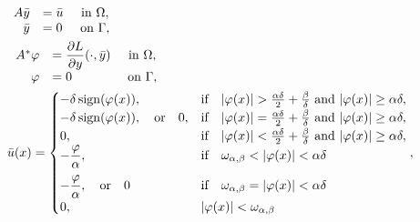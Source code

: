 \documentclass[11pt,a4paper]{amsart}
\newcommand{\om}{\Omega}
\newcommand{\ga}{\Gamma}
\newcommand{\sign}{\mathrm{sign}}
\begin{document}
\begin{subequations}\label{eq:optimal_system_P0}
	\begin{align}
&\begin{array}{rlc}
	A\bar y  & = \bar u & \text{ in } \om, \\
      \bar y &= 0 & \text{ on } \ga, 
\end{array}\\
%
&\,\begin{array}{rlc}
	A^*\varphi & = \dfrac{\partial L}{\partial y}(\cdot,\bar y)& \text{ in } \om, \\
      \varphi &= 0 & \text{ on } \ga ,
\end{array} \label{eq:optimal_system_P0_b}\\
& \bar u(x) = 
\begin{cases} 
-\delta \,\sign(\varphi(x)), &\text{if}\quad |\varphi(x)| > \frac{\alpha \delta}{2} + \frac{\beta}{\delta} \text{ and } |\varphi(x)| \ge \alpha\delta,\\
-\delta \,\sign(\varphi(x)), \quad\text{or}\quad 0, &\text{if}\quad |\varphi(x)| = \frac{\alpha \delta}{2} + \frac{\beta}{\delta} \text{ and } |\varphi(x)| \ge \alpha\delta,\\
0, & \text{if}\quad |\varphi(x)| <\frac{\alpha \delta}{2} + \frac{\beta}{\delta} \text{ and } |\varphi(x)| \ge \alpha\delta,\\
-\dfrac{\varphi}{\alpha},&\text{if}\quad\omega_{\alpha,\beta}< |\varphi(x)|<\alpha\delta \vspace{2mm}\\
-\dfrac{\varphi}{\alpha}, \quad\text{or}\quad 0&\text{if}\quad\omega_{\alpha,\beta}= |\varphi(x)|<\alpha\delta \\
0, &|\varphi(x)|<\omega_{\alpha,\beta}
\end{cases}
, \label{eq:optimal_system_P0_c}
\end{align}
\end{subequations}
 
\end{document}
